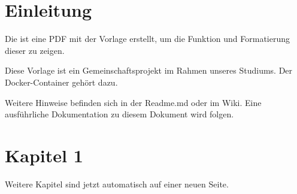 \section{Einleitung}
Die ist eine PDF mit der Vorlage erstellt, um die Funktion und Formatierung dieser zu zeigen.

Diese Vorlage ist ein Gemeinschaftsprojekt im Rahmen unseres Studiums.
Der Docker-Container gehört dazu.

Weitere Hinweise befinden sich in der Readme.md oder im Wiki.
Eine ausführliche Dokumentation zu diesem Dokument wird folgen.

\section{Kapitel 1}
Weitere Kapitel sind jetzt automatisch auf einer neuen Seite.